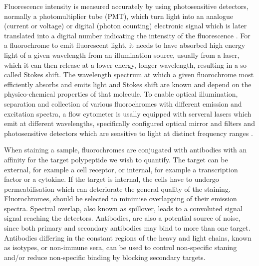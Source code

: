 Fluorescence intensity is measured accurately by using photosensitive detectors, normally a photomultiplier tube (PMT), which turn light into an analogue (current or voltage)
or digital (photon counting) electronic signal which is later translated into a digital number indicating the intensity of the fluorescence \citep{Shapiro:2003vq,Snow:2004ci}.
For a fluorochrome to emit fluorescent light, it needs to have absorbed high energy light of a given wavelength from an illumination source, usually from a laser, which it can then release at a lower energy, longer wavelength, resulting in a so-called Stokes shift.
The wavelength spectrum at which a given fluorochrome most efficiently absorbs and emits light and Stokes shift are known and depend on the physico-chemical properties of that molecule.
To enable optical illumination, separation and collection of various fluorochromes with different emission and excitation spectra, a flow cytometer is usally equipped with serveral lasers which emit at different wavelengths, specifically configured optical mirror and filters and photosensitive detectors which are sensitive to light at distinct frequency ranges \citep{Shapiro:2003vq}.


When staining a sample, fluorochromes are conjugated with antibodies with an affinity for the target polypeptide we wish to quantify.
The target can be external, for example a cell receptor, or internal, for example a transcription factor or a cytokine.
If the target is internal, the cells have to undergo permeabilisation which can deteriorate the general quality of the staining.
Fluorochromes, should be selected to minimise overlapping of their emission spectra.  Spectral overlap, also known as spillover, leads to a convoluted signal
signal reaching the detectors.
Antibodies, are also a potential source of noise, since both primary and secondary antibodies may bind to more than one target.
Antibodies differing in the constant regions of the heavy and light chains, known as isotypes, or non-immune sera, can be used to control non-specific staning and/or reduce non-specific binding by blocking secondary targets.

